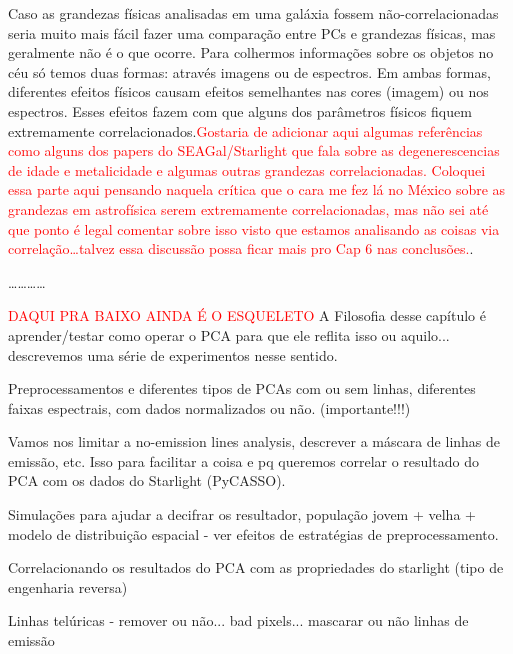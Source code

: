 Caso as grandezas físicas analisadas em uma galáxia fossem não-correlacionadas seria muito mais fácil fazer uma
comparação entre PCs e grandezas físicas, mas geralmente não é o que ocorre. Para colhermos informações sobre os objetos
no céu só temos duas formas: através imagens ou de espectros. Em ambas formas, diferentes efeitos físicos causam efeitos
semelhantes nas cores (imagem) ou nos espectros. Esses efeitos fazem com que alguns dos parâmetros físicos fiquem
extremamente correlacionados.\ojo \citneed \textcolor{red}{Gostaria de adicionar aqui algumas referências como alguns
dos papers do SEAGal/Starlight que fala sobre as degenerescencias de idade e metalicidade e algumas outras grandezas
correlacionadas. Coloquei essa parte aqui pensando naquela crítica que o cara me fez lá no México sobre as grandezas em
astrofísica serem extremamente correlacionadas, mas não sei até que ponto é legal comentar sobre isso visto que
estamos analisando as coisas via correlação\ldots talvez essa discussão possa ficar mais pro Cap 6 nas conclusões.}.

\ldots \dots \ldots \ldots

\textcolor{red}{DAQUI PRA BAIXO AINDA É O ESQUELETO}
\ojo A Filosofia desse capítulo é aprender/testar como operar o PCA para que ele
reflita isso ou aquilo... descrevemos uma série de experimentos nesse sentido.

Preprocessamentos e diferentes tipos de PCAs com ou sem linhas, diferentes
faixas espectrais, com dados normalizados ou não. (importante!!!)

Vamos nos limitar a no-emission lines analysis, descrever a máscara de linhas de
emissão, etc. Isso para facilitar a coisa e pq queremos correlar o resultado do
PCA com os dados do Starlight (PyCASSO).

Simulações para ajudar a decifrar os resultador, população jovem + velha +
modelo de distribuição espacial - ver efeitos de estratégias de
preprocessamento.

Correlacionando os resultados do PCA com as propriedades do starlight (tipo de
engenharia reversa)

Linhas telúricas - remover ou não... bad pixels... mascarar ou não linhas de
emissão